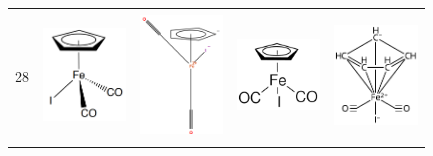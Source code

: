 \begin{landscape}
\begin{longtable}{m{0.3cm}
                >{\centering}m{4.8cm}
                >{\centering}m{4.8cm}
                >{\centering}m{4.8cm}
                >{\centering\arraybackslash}m{4.8cm}}
 28 &
\includegraphics[width=2.2cm]{imagenes/resultados/anexo_expertos/mol28.png} & 
 \includegraphics[width=2.2cm]{imagenes/resultados/moleculas/iron(II).png} & 
 \includegraphics[width=2.2cm]{imagenes/sigmaAldrich/Dicarbonylcyclopentadienyliodoiron(II).png} & 
 \includegraphics[width=2.2cm]{imagenes/sciFinder/pdf/Dicarbonylcyclopentadienyliodoiron(II).pdf}


\label{tab:expertos_dibujos}

\end{longtable}

\end{landscape}



